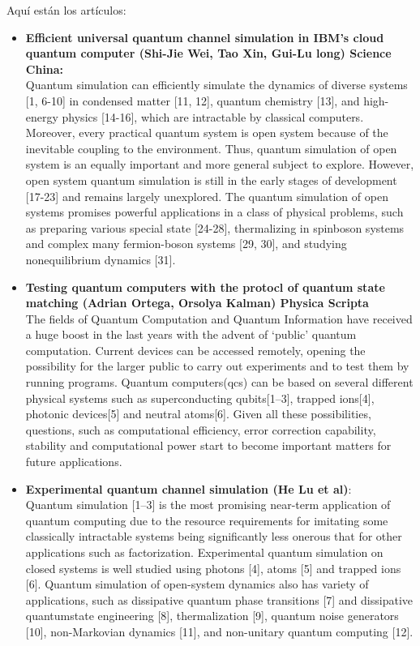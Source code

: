\documentclass[10pt,letterpaper]{article} %
\begin{document}
Aquí están los artículos:

\begin{itemize}
\item \textbf{Efficient universal quantum channel simulation in IBM's cloud quantum computer (Shi-Jie Wei, Tao Xin, Gui-Lu long) Science China:}\\ 

Quantum simulation can efficiently simulate the dynamics of diverse systems
[1, 6-10] in condensed matter [11, 12], quantum chemistry
[13], and high-energy physics [14-16], which are intractable
by classical computers. Moreover, every practical quantum
system is open system because of the inevitable coupling to
the environment. {\color{green} Thus, quantum simulation of open system
is an equally important and more general subject to explore.
However, open system quantum simulation is still in the
early stages of development [17-23] and remains largely unexplored. The quantum simulation of open systems promises
powerful applications in a class of physical problems, such as
preparing various special state [24-28], thermalizing in spinboson systems and complex many fermion-boson systems
[29, 30], and studying nonequilibrium dynamics [31].} \\

\item \textbf{Testing quantum computers with the protocl of quantum state matching (Adrian Ortega, Orsolya Kalman) Physica Scripta} \\

The fields of Quantum Computation and Quantum Information have received a huge boost in the last years with
the advent of ‘public’ quantum computation.
{\color{blue} Current devices can be accessed remotely, opening the possibility
for the larger public to carry out experiments and to test them by running programs.} Quantum computers(qcs)
can be based on several different physical systems such as superconducting qubits[1–3], trapped ions[4],
photonic devices[5] and neutral atoms[6]. Given all these possibilities, questions, such as computational
efficiency, error correction capability, stability and computational power start to become important matters for
future applications.\\

\item \textbf{Experimental quantum channel simulation (He Lu et al)}: \\

{ \color{blue} Quantum simulation [1–3] is the most promising near-term
application of quantum computing due to the resource requirements for imitating some classically intractable systems
being significantly less onerous that for other applications
such as factorization.} Experimental quantum simulation on
closed systems is well studied using photons [4], atoms [5]
and trapped ions [6]. Quantum simulation of open-system
dynamics also has variety of applications, such as dissipative quantum phase transitions [7] and dissipative quantumstate engineering [8], thermalization [9], quantum noise generators [10], non-Markovian dynamics [11], and non-unitary
quantum computing [12].


\end{itemize}
\end{document}
